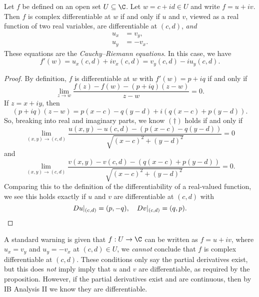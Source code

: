 \documentclass[a4paper]{article}
\begin{document}
\begin{prop}
  Let $f$ be defined on an open set $U \subseteq \C$. Let $w = c + id \in U$ and write $f = u + iv$. Then $f$ is complex differentiable at $w$ if and only if $u$ and $v$, viewed as a real function of two real variables, are differentiable at $(c, d)$, \emph{and}
  \begin{align*}
    u_x &= v_y,\\
    u_y &= -v_x.
  \end{align*}
  These equations are the \emph{Cauchy--Riemann equations}. In this case, we have
  \[
    f'(w) = u_x(c, d) + iv_x(c, d) = v_y(c, d) -i u_y(c, d).
  \]
\end{prop}

\begin{proof}
  By definition, $f$ is differentiable at $w$ with $f'(w) = p + iq$ if and only if
  \[
    \lim_{z \to w} \frac{f(z) - f(w) - (p + iq)(z - w)}{z - w} = 0. \tag{$\dagger$}
  \]
  If $z = x + iy$, then
  \[
    (p + iq) (z - w) = p(x - c) - q(y - d) + i(q(x - c) + p (y - d)).
  \]
  So, breaking into real and imaginary parts, we know $(\dagger)$ holds if and only if
  \[
    \lim_{(x, y) \to (c, d)} \frac{u(x, y) - u(c, d) - (p(x - c) - q(y - d))}{\sqrt{(x - c)^2 + (y - d)^2}} = 0
  \]
  and
  \[
    \lim_{(x, y) \to (c, d)} \frac{v(x, y) - v(c, d) - (q(x - c) + p(y - d))}{\sqrt{(x - c)^2 + (y - d)^2}} = 0.
  \]
  Comparing this to the definition of the differentiability of a real-valued function, we see this holds exactly if $u$ and $v$ are differentiable at $(c, d)$ with
  \[
    Du|_{(c, d)} = (p, -q),\quad Dv|_{(c, d)} = (q, p).\qedhere
  \]
\end{proof}
A standard warning is given that $f: U \to \C$ can be written as $f = u + iv$, where $u_x = v_y$ and $u_y = -v_x$ at $(c, d) \in U$, we \emph{cannot} conclude that $f$ is complex differentiable at $(c, d)$. These conditions only say the partial derivatives exist, but this does \emph{not} imply imply that $u$ and $v$ are differentiable, as required by the proposition. However, if the partial derivatives exist and are continuous, then by IB Analysis II we know they are differentiable.
\end{document}

